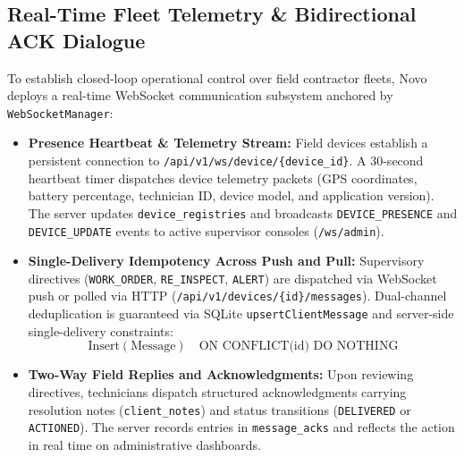 \documentclass[conference]{IEEEtran}
\begin{document}
\subsection{Real-Time Fleet Telemetry \& Bidirectional ACK Dialogue}
To establish closed-loop operational control over field contractor fleets, Novo deploys a real-time WebSocket communication subsystem anchored by \texttt{WebSocketManager}:
\begin{itemize}
    \item \textbf{Presence Heartbeat \& Telemetry Stream:} Field devices establish a persistent connection to \texttt{/api/v1/ws/device/\{device\_id\}}. A 30-second heartbeat timer dispatches device telemetry packets (GPS coordinates, battery percentage, technician ID, device model, and application version). The server updates \texttt{device\_registries} and broadcasts \texttt{DEVICE\_PRESENCE} and \texttt{DEVICE\_UPDATE} events to active supervisor consoles (\texttt{/ws/admin}).
    \item \textbf{Single-Delivery Idempotency Across Push and Pull:} Supervisory directives (\texttt{WORK\_ORDER}, \texttt{RE\_INSPECT}, \texttt{ALERT}) are dispatched via WebSocket push or polled via HTTP (\texttt{/api/v1/devices/\{id\}/messages}). Dual-channel deduplication is guaranteed via SQLite \texttt{upsertClientMessage} and server-side single-delivery constraints:
    \begin{equation}
    \text{Insert}(\text{Message}) \quad \text{ON CONFLICT(id) DO NOTHING}
    \label{eq:idempotency_msg}
    \end{equation}
    \item \textbf{Two-Way Field Replies and Acknowledgments:} Upon reviewing directives, technicians dispatch structured acknowledgments carrying resolution notes (\texttt{client\_notes}) and status transitions (\texttt{DELIVERED} or \texttt{ACTIONED}). The server records entries in \texttt{message\_acks} and reflects the action in real time on administrative dashboards.
\end{itemize}
\end{document}
